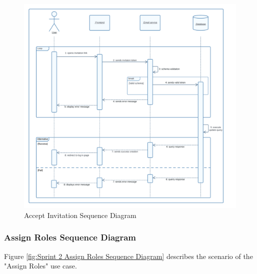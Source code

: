 \begin{figure}[ht]
	\centering
	\includegraphics[width=\linewidth]{Images/sprint2/accept invitation sequence diag.png}
	\caption{ Accept Invitation Sequence Diagram}
	\label{fig:Sprint 2 Accept Invitation Sequence Diagram}
\end{figure}

\clearpage

\subsubsection{Assign Roles Sequence Diagram}

Figure \ref{fig:Sprint 2 Assign Roles Sequence Diagram} describes the scenario of the "Assign Roles" use case.


